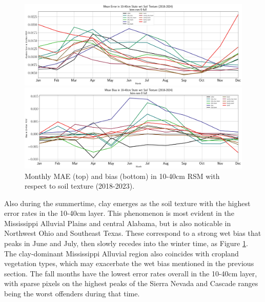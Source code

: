 \begin{figure}[h!]
    \centering

    \includegraphics[width=.99\linewidth,draft=false]{figures/grid-eval_qtrly/eval-grid_full_lstm-rsm-9_pixelwise-time-stats_monthly-txtr-abs-err-state-rsm-40.png}

    \includegraphics[width=.99\linewidth,draft=false]{figures/grid-eval_qtrly/eval-grid_full_lstm-rsm-9_pixelwise-time-stats_monthly-txtr-bias-state-rsm-40.png}

    \caption{Monthly MAE (top) and bias (bottom) in 10-40cm RSM with respect to soil texture (2018-2023).}
    \label{bulk-eval_monthly_txtr-bias_rsm-40}
\end{figure}


Also during the summertime, clay emerges as the soil texture with the highest error rates in the 10-40cm layer. This phenomenon is most evident in the Mississippi Alluvial Plains and central Alabama, but is also noticable in Northwest Ohio and Southeast Texas. These correspond to a strong wet bias that peaks in June and July, then slowly recedes into the winter time, as Figure \ref{bulk-eval_monthly_txtr-bias_rsm-40}. The clay-dominant Mississippi Alluvial region also coincides with cropland vegetation types, which may exacerbate the wet bias mentioned in the previous section. The fall months have the lowest error rates overall in the 10-40cm layer, with sparse pixels on the highest peaks of the Sierra Nevada and Cascade ranges being the worst offenders during that time.

